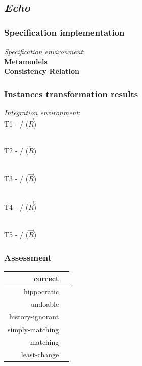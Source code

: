 \documentclass{article}
\begin{document}
\pagebreak
\subsection{\textit{Echo}}
\subsubsection{Specification implementation}
\textit{Specification environment}:
~\\

\textbf{Metamodels}
~\\

\textbf{Consistency Relation}


\subsubsection{Instances transformation results}
\textit{Integration environment}:
~\\

T1 -  /  ($\overrightarrow{R}$)

~\\

T2 -  /  ($\overleftarrow{R}$)

~\\

T3 -  /  ($\overrightarrow{R}$)

~\\

T4 -  /  ($\overrightarrow{R}$)

~\\

T5 -  /  ($\overrightarrow{R}$)

\subsubsection{Assessment}

\begin{center}
\begin{tabular}{| r | c |}
  \hline                        
  correct & \\
  \hline
  hippocratic & \\
  \hline 
  undoable & \\
  \hline 
  history-ignorant & \\
  \hline 
  simply-matching & \\
  \hline 
  matching & \\
  \hline 
  least-change & \\
  \hline   
\end{tabular}
\end{center}
\end{document}
